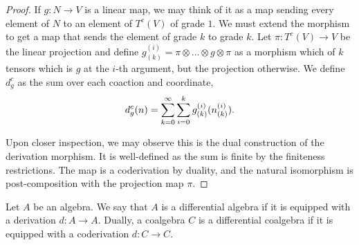 \documentclass[../thesis.tex]{subfiles}
\begin{document}
\begin{proof}
                If $g: N \rightarrow V$ is a linear map, we may think of it as a map sending every element of $N$ to an element of $T^c(V)$ of grade $1$. We must extend the morphism to get a map that sends the element of grade $k$ to grade $k$. Let $\pi: T^c(V) \rightarrow V$ be the linear projection and define $g_{(k)}^{(i)} = \pi\otimes ... \otimes g \otimes \pi$ as a morphism which of $k$ tensors which is $g$ at the $i$-th argument, but the projection otherwise. We define $d_g^c$ as the sum over each coaction and coordinate,
                \begin{align*}
                    d_g^c(n) = \sum_{k=0}^\infty \sum_{i=0}^k g_{(k)}^{(i)}(n_{(k)}^{(i)})\tt{.}
                \end{align*}
                
                Upon closer inspection, we may observe this is the dual construction of the derivation morphism. It is well-defined as the sum is finite by the finiteness restrictions. The map is a coderivation by duality, and the natural isomorphism is post-composition with the projection map $\pi$.
            \end{proof}

            \begin{definition}
                Let $A$ be an algebra. We say that $A$ is a differential algebra if it is equipped with a derivation $d: A\rightarrow A$. Dually, a coalgebra $C$ is a differential coalgebra if it is equipped with a coderivation $d: C\rightarrow C$.
            \end{definition}
\end{document}
